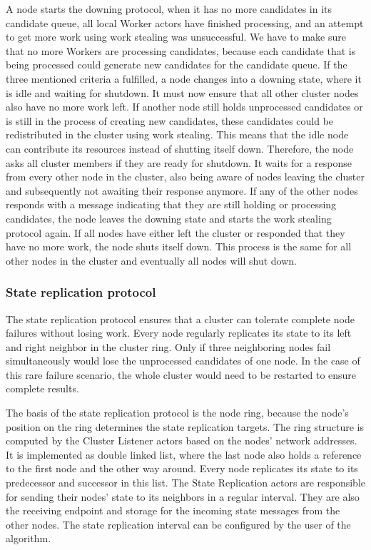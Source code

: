   A node starts the downing protocol, when it has no more candidates in its candidate queue, all local Worker actors have finished processing, and an attempt to get more work using work stealing was unsuccessful.
  We have to make sure that no more Workers are processing candidates, because each candidate that is being processed could generate new candidates for the candidate queue.
  If the three mentioned criteria a fulfilled, a \dodo{} node changes into a downing state, where it is idle and waiting for shutdown.
  It must now ensure that all other cluster nodes also have no more work left.
  If another node still holds unprocessed candidates or is still in the process of creating new candidates, these candidates could be redistributed in the cluster using work stealing.
  This means that the idle node can contribute its resources instead of shutting itself down.
  Therefore, the node asks all cluster members if they are ready for shutdown.
  It waits for a response from every other node in the cluster, also being aware of nodes leaving the cluster and subsequently not awaiting their response anymore.
  If any of the other nodes responds with a message indicating that they are still holding or processing candidates, the node leaves the downing state and starts the work stealing protocol again.
  If all nodes have either left the cluster or responded that they have no more work, the node shuts itself down.
  This process is the same for all other nodes in the cluster and eventually all nodes will shut down.

\subsubsection{State replication protocol}\label{protocol:stateReplication}

  The state replication protocol ensures that a \dodo{} cluster can tolerate complete node failures without losing work.
  Every node regularly replicates its state to its left and right neighbor in the cluster ring.
  Only if three neighboring nodes fail simultaneously would \dodo{} lose the unprocessed candidates of one node.
  In the case of this rare failure scenario, the whole \dodo{} cluster would need to be restarted to ensure complete results.

  The basis of the state replication protocol is the node ring, because the node's position on the ring determines the state replication targets.
  The ring structure is computed by the Cluster Listener actors based on the nodes' network addresses.
  It is implemented as double linked list, where the last node also holds a reference to the first node and the other way around.
  Every node replicates its state to its predecessor and successor in this list.
  The State Replication actors are responsible for sending their nodes' state to its neighbors in a regular interval.
  They are also the receiving endpoint and storage for the incoming state messages from the other nodes.
  The state replication interval can be configured by the user of the \dodo{} algorithm.

